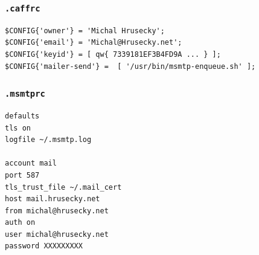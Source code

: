 \begin{frame}[t,fragile]
   \frametitle{\texttt{.caffrc}}
\begin{verbatim}
$CONFIG{'owner'} = 'Michal Hrusecky';
$CONFIG{'email'} = 'Michal@Hrusecky.net';
$CONFIG{'keyid'} = [ qw{ 7339181EF3B4FD9A ... } ];
$CONFIG{'mailer-send'} =  [ '/usr/bin/msmtp-enqueue.sh' ];
\end{verbatim}
\end{frame}

\begin{frame}[t,fragile]
   \frametitle{\texttt{.msmtprc}}
\begin{verbatim}
defaults
tls on
logfile ~/.msmtp.log

account mail
port 587
tls_trust_file ~/.mail_cert
host mail.hrusecky.net
from michal@hrusecky.net
auth on
user michal@hrusecky.net
password XXXXXXXXX
\end{verbatim}
\end{frame}
